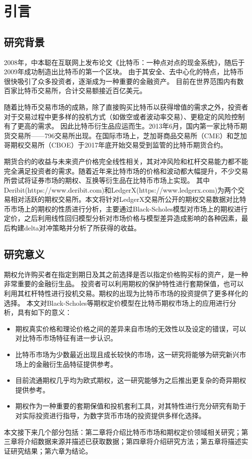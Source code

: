 \chapter{引言}
\section{研究背景}
\par{2008年，中本聪在互联网上发布论文《比特币：一种点对点的现金系统》\cite{Nakamoto_bitcoin:a}，随后于2009年成功制造出比特币的第一个区块。
由于其安全、去中心化的特点，比特币很快吸引了众多投资者，逐渐成为一种重要的金融资产。
目前在世界范围内有数百家比特币交易所，合计交易额接近百亿美元。
}
\par{随着比特币交易市场的成熟，除了直接购买比特币以获得增值的需求之外，投资者对于交易过程中更多样的投机方式（如做空或者波动率交易）、更稳定的风险控制有了更高的需求。
因此比特币衍生品应运而生。2013年6月，国内第一家比特币期货交易所——796交易所出现。在国际市场上，芝加哥商品交易所（CME）和芝加哥期权交易所（CBOE）于2017年底开始交易受到监管的比特币期货合约。
}
\par{期货合约的收益与未来资产价格完全线性相关，其对冲风险和杠杆交易能力都不能完全满足投资者的需求。随着近年来比特市场的价格和波动都大幅提升，不少交易所尝试将证券市场的期权、互换等衍生品在比特币市场上实现。
其中Deribit(https://www.deribit.com)和LedgerX(https://www.ledgerx.com)为两个交易相对活跃的期权交易所。本文将针对LedgerX交易所公开的期权交易数据对比特币市场上的期权的性质进行分析，主要通过Black-Scholes模型对市场上的期权进行定价，之后利用线性回归模型分析对市场价格与模型差异造成影响的各种因素，最后构建delta对冲策略并分析了所获得的收益。}
\section{研究意义}
期权允许购买者在指定到期日及其之前选择是否以指定价格购买标的资产，是一种非常重要的金融衍生品。
投资者可以利用期权的保护特性进行套期保值，也可以利用其杠杆特性进行投机交易。期权的出现为比特币市场的投资提供了更多样化的选择。
本文对Black-Scholes等期权定价模型在比特币期权市场上的应用进行分析，具有如下的意义：
\begin{itemize}
    \item 期权真实价格和理论价格之间的差异来自市场的无效性以及设定的错误，可以对比特币市场特征有进一步认识。
    \item  比特币市场为少数最近出现且成长较快的市场，这一研究将能够为研究新兴市场上的金融衍生品特征提供参考。
    \item 目前流通期权几乎均为欧式期权，这一研究能够为之后推出更复杂的奇异期权提供参考。
    \item 期权作为一种重要的套期保值和投机套利工具，对其特性进行充分研究有助于对实际投资进行指导，为数字货币市场的投资提供多样化选择。
  \end{itemize}
本文接下来几个部分包括：第二章将介绍比特币市场和期权定价领域相关研究；第三章将介绍数据来源并描述已获取数据；第四章将介绍研究方法；第五章将描述实证研究结果；第六章为结论。